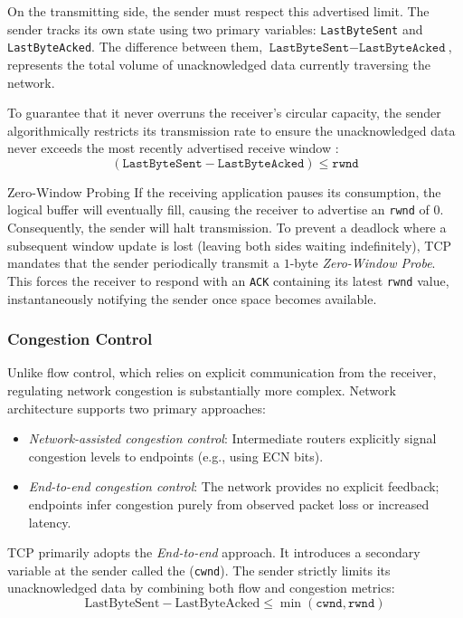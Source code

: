 On the transmitting side, the sender must respect this advertised limit. The sender tracks its own state using two primary variables: \texttt{LastByteSent} and \texttt{LastByteAcked}. The difference between them, \( \texttt{LastByteSent} - \texttt{LastByteAcked} \), represents the total volume of unacknowledged data currently traversing the network. 

To guarantee that it never overruns the receiver's circular capacity, the sender algorithmically restricts its transmission rate to ensure the unacknowledged data never exceeds the most recently advertised receive window \cite{rfc9293}:
\[
(\texttt{LastByteSent} - \texttt{LastByteAcked}) \le \texttt{rwnd}
\]

\begin{note}{Zero-Window Probing}
If the receiving application pauses its consumption, the logical buffer will eventually fill, causing the receiver to advertise an \texttt{rwnd} of \( 0 \). Consequently, the sender will halt transmission. To prevent a deadlock where a subsequent window update is lost (leaving both sides waiting indefinitely), TCP mandates that the sender periodically transmit a \( 1 \)-byte \emph{Zero-Window Probe}. This forces the receiver to respond with an \texttt{ACK} containing its latest \texttt{rwnd} value, instantaneously notifying the sender once space becomes available.
\end{note}

\subsubsection{Congestion Control}
Unlike flow control, which relies on explicit communication from the receiver, regulating network congestion is substantially more complex. Network architecture supports two primary approaches:
\begin{itemize}
    \item \emph{Network-assisted congestion control}: Intermediate routers explicitly signal congestion levels to endpoints (e.g., using ECN bits).
    \item \emph{End-to-end congestion control}: The network provides no explicit feedback; endpoints infer congestion purely from observed packet loss or increased latency.
\end{itemize}

TCP primarily adopts the \emph{End-to-end} approach. It introduces a secondary variable at the sender called the  (\texttt{cwnd}). The sender strictly limits its unacknowledged data by combining both flow and congestion metrics: 
\[
\text{LastByteSent} - \text{LastByteAcked} \le \min(\texttt{cwnd}, \texttt{rwnd})
\]

